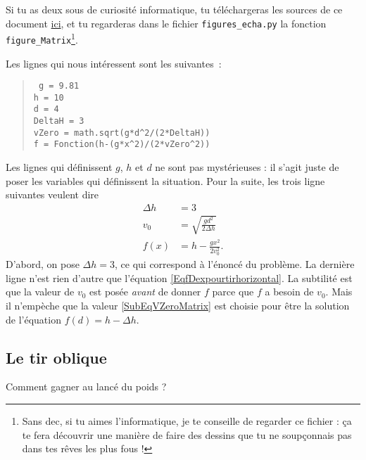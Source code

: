 \documentclass[a4paper,12pt]{book}
\theoremstyle{mes_exemples}	\newtheorem{exemple}[numtho]{Exemple}
\theoremstyle{mes_tho}
\begin{document}
Si tu as deux sous de curiosité informatique, tu téléchargeras les sources de ce document \href{http://student.ulb.ac.be/~lclaesse/physique-math.tar.gz}{ici}, et tu regarderas dans le fichier \texttt{figures\_echa.py} la fonction \texttt{figure\_Matrix}\footnote{Sans dec, si tu aimes l'informatique, je te conseille de regarder ce fichier : ça te fera découvrir une manière de faire des dessins que tu ne soupçonnais pas dans tes rêves les plus fous !}.

Les lignes qui nous intéressent sont les suivantes~:
\begin{quote}
	\texttt{ 
	g = 9.81					\\
	h = 10						\\
	d = 4						\\
	DeltaH = 3					\\
	vZero = math.sqrt(g*d\textasciicircum 2/(2*DeltaH))		\\
	f = Fonction(h-(g*x\textasciicircum 2)/(2*vZero\textasciicircum 2))		
	}
\end{quote}
Les lignes qui définissent $g$, $h$ et $d$ ne sont pas mystérieuses : il s'agit juste de poser les variables qui définissent la situation. Pour la suite, les trois ligne suivantes veulent dire
\begin{subequations}
	\begin{align}
		\Delta h&=3\\
		v_0&=\sqrt{ \frac{ gd^2 }{ 2\Delta h } }	\label{SubEqVZeroMatrix}\\
		f(x)&=h-\frac{ gx^2 }{ 2v_0^2 }.
	\end{align}
\end{subequations}
D'abord, on pose $\Delta h=3$, ce qui correspond à l'énoncé du problème. La dernière ligne n'est rien d'autre que l'équation \eqref{EqfDexpourtirhorizontal}. La subtilité est que la valeur de $v_0$ est posée \emph{avant} de donner $f$ parce que $f$ a besoin de $v_0$. Mais il n'empèche que la valeur \eqref{SubEqVZeroMatrix} est choisie pour être la solution de l'équation $f(d)=h-\Delta h$.


\subsection{Le tir oblique}

\begin{pourquoidonc}
	Comment gagner au lancé du poids ?
\end{pourquoidonc}
\end{document}

